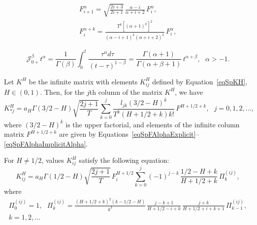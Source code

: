\documentclass[10pt,a4paper]{amsart}
\newcommand{\cj}{\mathcal{J}}
\begin{document}
\begin{gather}
  F_{i+1}^\alpha = \sqrt{\frac{2i+3}{2i+1}} \, \frac{\alpha-i}{\alpha+i+2} \, F_i^\alpha, \label{eqSpFAlphaImplicit} \\
  F_i^{\alpha+k} = \frac{T^k [(\alpha+1)^{\overline{k}}]^2}{(\alpha-i+1)^{\overline{k}}(\alpha+i+2)^{\overline{k}}} \, F_i^\alpha, \label{eqSpFAlphaImplicitAlpha}
\end{gather}

\begin{equation}\label{eqFracInt}
  \cj_{0+}^\beta t^\alpha = \frac{1}{\Gamma(\beta)} \int_0^t {\frac{\tau^\alpha d\tau}{(t-\tau)^{1-\beta}}} = \frac{\Gamma(\alpha+1)}{\Gamma(\alpha+\beta+1)} \, t^{\alpha+\beta}, \ \ \ \alpha > -1.
\end{equation}

\begin{theorem}\label{thmMain}
Let $K^H$ be the infinite matrix with elements $K_{ij}^H$ defined by Equation~\eqref{eqSpKH}, $H \in (0,1)$. Then, for the $j$th column of the matrix $K^H$, we have
\begin{equation}\label{eqSpOperKHLExplicit}
  K_{*j}^H = a_H \Gamma(3/2-H) \sqrt{\frac{2j+1}{T}} \sum\limits_{k=0}^j \frac{l_{jk} (3/2-H)^{\overline{k}}}{T^k (H+1/2+k) k!} \, F^{H+1/2+k}, \ \ \ j = 0,1,2,\dots,
\end{equation}
where $(3/2-H)^{\overline{k}}$ is the upper factorial, and elements of the infinite column matrix $F^{H+1/2+k}$ are given by Equations~\eqref{eqSpFAlphaExplicit}--\eqref{eqSpFAlphaImplicitAlpha}.

For $H \neq 1/2$, values $K_{ij}^H$ satisfy the following equation:
\begin{equation}\label{eqSpOperKHijExplicit}
  K_{ij}^H = a_H \Gamma(1/2-H) \sqrt{\frac{2j+1}{T}} \, F_i^{H+1/2} \sum\limits_{k=0}^j (-1)^{j-k} \, \frac{1/2-H+k}{H+1/2+k} \, \Pi_k^{(ij)},
\end{equation}
where
\begin{gather*}
  \Pi_0^{(ij)} = 1, \ \ \ \Pi_k^{(ij)} = \frac{(H+1/2+k)^2 (k-1/2-H)}{k^3} \, \frac{j-k+1}{H+1/2-i+k} \, \frac{j+k}{H+1/2+i+k+1} \, \Pi_{k-1}^{(ij)}, \\
  k = 1,2,\dots
\end{gather*}
\end{theorem}
\end{document}

